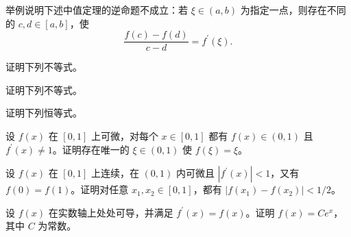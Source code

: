 \noindent\begin{minipage}{\textwidth}
举例说明下述中值定理的逆命题不成立：若 $\xi\in(a,b)$ 为指定一点，则存在不同的 $c,d\in[a,b]$，使\[\frac{f(c)-f(d)}{c-d}=f^{\prime}(\xi).\]
\end{minipage}\par\vfill
\noindent\begin{minipage}{\textwidth}
证明下列不等式。
\end{minipage}\par\vfill
\newpage
\noindent\begin{minipage}{\textwidth}
证明下列不等式。
\end{minipage}\par\vfill
\noindent\begin{minipage}{\textwidth}
证明下列恒等式。
\end{minipage}\par\vfill
\noindent\begin{minipage}{\textwidth}
设 $f(x)$ 在 $[0,1]$ 上可微，对每个 $x\in[0,1]$ 都有 $f(x)\in(0,1)$ 且 $f^{\prime}(x)\ne1$。证明存在唯一的 $\xi\in(0,1)$ 使 $f(\xi)=\xi$。
\end{minipage}\par\vfill
\noindent\begin{minipage}{\textwidth}
设 $f(x)$ 在 $[0,1]$ 上连续，在 $(0,1)$ 内可微且 $|f^{\prime}(x)|<1$，又有 $f(0)=f(1)$。证明对任意 $x_1,x_2\in[0,1]$，都有 $|f(x_1)-f(x_2)|<1/2$。
\end{minipage}\par\vfill
\newpage
\noindent\begin{minipage}{\textwidth}
设 $f(x)$ 在实数轴上处处可导，并满足 $f^{\prime}(x)=f(x)$。证明 $f(x)=Ce^x$，其中 $C$ 为常数。
\end{minipage}\par\vfill
